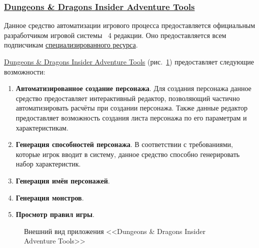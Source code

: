 \subsubsection{\href{http://www.wizards.com/dnd/Tool.aspx?x=dnd/4new/tool/adventuretools}{Dungeons \& Dragons Insider Adventure Tools}}
Данное средство автоматизации игрового процесса предоставляется официальным разработчиком игровой системы \dnd\ 4 редакции. Оно предоставляется всем подписчикам \href{http://www.wizards.com/dnd}{специализированного ресурса}.

\href{http://www.wizards.com/dnd/Tool.aspx?x=dnd/4new/tool/adventuretools}{Dungeons \& Dragons Insider Adventure Tools} (рис.~\ref{ris:dnd_insider}) предоставляет следующие возможности:
\begin{enumerate}
\item \textbf{Автоматизированное создание персонажа}. Для создания персонажа данное средство предоставляет интерактивный редактор, позволяющий частично автоматизировать расчёты при создании персонажа. Также данные редактор предоставляет возможность создания листа персонажа по его параметрам и характеристикам.
\item \textbf{Генерация способностей персонажа}. В соответствии с требованиями, которые игрок вводит в систему, данное средство способно генерировать набор характеристик.
\item \textbf{Генерация имён персонажей}.
\item \textbf{Генерация монстров}.
\item \textbf{Просмотр правил игры}.
\end{enumerate}

\begin{figure}[!h]
\caption{Внешний вид приложения <<Dungeons \& Dragons Insider Adventure Tools>>}
\label{ris:dnd_insider}
\end{figure}


